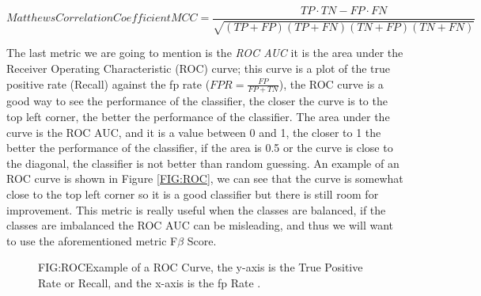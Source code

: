 \begin{equation}[EQ:MCC]{Matthews Correlation Coefficient}
    \boxed{MCC = \frac{TP \cdot TN - FP \cdot FN}{\sqrt{(TP + FP)(TP + FN)(TN + FP)(TN + FN)}}}
\end{equation}

The last metric we are going to mention is the \textit{ROC AUC} it is the area under %
the Receiver Operating Characteristic (ROC) curve; this curve is a plot of the true positive rate (Recall) against the \acl{fp} rate ($FPR = \frac{FP}{FP + TN}$), the ROC curve is a good way to see the performance of the classifier, the closer the curve is to the top left corner, the better the performance of the classifier. The area under the curve is the ROC AUC, and it is a value between 0 and 1, the closer to 1 the better the performance of the classifier, if the area is 0.5 or the curve is close to the diagonal, the classifier is not better than random guessing. An example of an ROC curve is shown in Figure \ref{FIG:ROC}, we can see that the curve is somewhat close to the top left corner so it is a good classifier but there is still room for improvement. This metric is really useful when the classes are balanced, if the classes are imbalanced the ROC AUC can be misleading, and thus we will want to use the aforementioned metric F$\beta$ Score.

\begin{figure}[ROC Curve Example \cite{chazhoor_roc_2019}.]{FIG:ROC}{Example of a ROC Curve, the y-axis is the True Positive Rate or Recall, and the x-axis is the \ac{fp} Rate \cite{chazhoor_roc_2019}.}
\end{figure}

